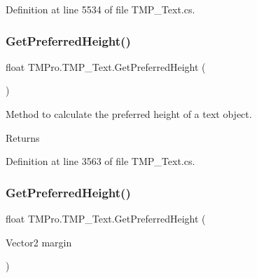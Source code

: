 Definition at line 5534 of file T\+M\+P\+\_\+\+Text.\+cs.

\mbox{\label{class_t_m_pro_1_1_t_m_p___text_a754e5a230232f1ed55615e55a3ed32ad}} 
\subsubsection{\texorpdfstring{GetPreferredHeight()}{GetPreferredHeight()}\hspace{0.1cm}{\footnotesize\ttfamily [1/2]}}
{\footnotesize\ttfamily float T\+M\+Pro.\+T\+M\+P\+\_\+\+Text.\+Get\+Preferred\+Height (\begin{DoxyParamCaption}{ }\end{DoxyParamCaption})\hspace{0.3cm}{\ttfamily [protected]}}



Method to calculate the preferred height of a text object. 

\begin{DoxyReturn}{Returns}

\end{DoxyReturn}


Definition at line 3563 of file T\+M\+P\+\_\+\+Text.\+cs.

\mbox{\label{class_t_m_pro_1_1_t_m_p___text_a5eee2a6865eefd94c604facff1168d9e}} 
\subsubsection{\texorpdfstring{GetPreferredHeight()}{GetPreferredHeight()}\hspace{0.1cm}{\footnotesize\ttfamily [2/2]}}
{\footnotesize\ttfamily float T\+M\+Pro.\+T\+M\+P\+\_\+\+Text.\+Get\+Preferred\+Height (\begin{DoxyParamCaption}\item[{Vector2}]{margin }\end{DoxyParamCaption})\hspace{0.3cm}{\ttfamily [protected]}}



